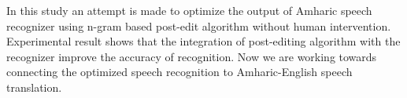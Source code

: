 In this study an attempt is made to optimize the output of Amharic speech recognizer using n-gram based post-edit algorithm without human intervention. Experimental result shows that the integration of post-editing algorithm with the recognizer improve the accuracy of recognition. Now we are working towards connecting the optimized speech recognition to Amharic-English speech translation.
